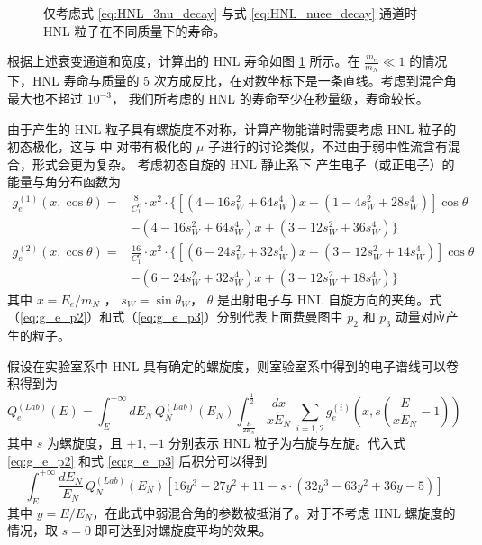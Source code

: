 \documentclass[UTF8]{ctexart}
\begin{document}
\begin{figure}[htbp]
  \centering
  
  \vspace{-1.0cm}
  \caption{仅考虑式 \ref{eq:HNL_3nu_decay} 与式 \ref{eq:HNL_nuee_decay} 通道时 HNL 粒子在不同质量下的寿命。}
  \label{fig:HNL_lifetime}
\end{figure}

根据上述衰变通道和宽度，计算出的 HNL 寿命如图 \ref{fig:HNL_lifetime} 所示。在 $\frac{m_e}{m_N} \ll 1$ 的情况
下，HNL 寿命与质量的 5 次方成反比，在对数坐标下是一条直线。考虑到混合角最大也不超过 $10^{-3}$，
我们所考虑的 HNL 的寿命至少在秒量级，寿命较长。

由于产生的 HNL 粒子具有螺旋度不对称，计算产物能谱时需要考虑 HNL 粒子的初态极化，这与 \cite{kelner2006energy} 中
对带有极化的 $\mu$ 子进行的讨论类似，不过由于弱中性流含有混合，形式会更为复杂。
考虑初态自旋的 HNL 静止系下
产生电子（或正电子）的能量与角分布函数为
\begin{equation}
\begin{split}
  g_e^{(1)}(x, \cos{\theta}) = &\frac{8}{C_1^e} \cdot x^2 \cdot \{ [(4 - 16 s_W^2 + 64 s_W^4) x - (1 - 4 s_W^2 + 28 s_W^4)] \cos{\theta} \\
                         &- (4 - 16 s_W^2 + 64 s_W^4) x + (3 - 12 s_W^2 + 36 s_W^4) \} \label{eq:g_e_p2}
\end{split}
\end{equation}
\begin{equation}
\begin{split}
  g_e^{(2)}(x, \cos{\theta}) = &\frac{16}{C_1^e} \cdot x^2 \cdot \{ [(6 - 24 s_W^2 + 32 s_W^4) x - (3 - 12 s_W^2 + 14 s_W^4)] \cos{\theta} \\
                         &- (6 - 24 s_W^2 + 32 s_W^4) x + (3 - 12 s_W^2 + 18 s_W^4) \} \label{eq:g_e_p3}
\end{split}
\end{equation}
其中 $x = E_e / m_N$ ， $s_W = \sin{\theta_W}$， $\theta$ 是出射电子与 HNL 自旋方向的夹角。式（\ref{eq:g_e_p2}）和式（\ref{eq:g_e_p3}）分别代表上面费曼图中
$p_2$ 和 $p_3$ 动量对应产生的粒子。

假设在实验室系中 HNL 具有确定的螺旋度，则室验室系中得到的电子谱线可以卷积得到为
\begin{equation}
  Q_e^{(Lab)}(E) = \int_{E}^{+\infty} d E_N \, Q_N^{(Lab)}(E_N) \int_{\frac{E}{2 E_N}}^{\frac{1}{2}}  \frac{d x}{x E_N} \, \sum_{i=1,2} g_e^{(i)}(x, s (\frac{E}{x E_N} - 1))
\end{equation}
其中 $s$ 为螺旋度，且 $+1,-1$ 分别表示 HNL 粒子为右旋与左旋。代入式 \ref{eq:g_e_p2} 和式 \ref{eq:g_e_p3} 后积分可以得到
\begin{equation}
  \int_{E}^{+\infty} \frac{d E_N}{E_N} \, Q_N^{(Lab)}(E_N) [16 y^3 - 27 y^2 + 11 -  s \cdot (32 y^3 - 63 y^2 + 36 y - 5) ]
\end{equation}
其中 $y=E/E_N$，在此式中弱混合角的参数被抵消了。对于不考虑 HNL 螺旋度的情况，取 $s=0$ 即可达到对螺旋度平均的效果。
\end{document}
